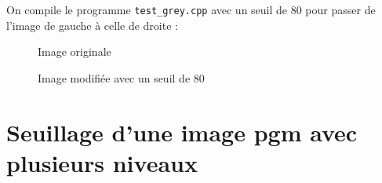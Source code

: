 \documentclass[french,a4paper,10pt]{article}
\begin{document}
	On compile le programme \texttt{test\_grey.cpp} avec un seuil de 80 pour passer de l'image de gauche à celle de
	droite :
	\begin{figure}[!htb]
		\begin{minipage}{0.48\textwidth}
			\centering
			\caption{Image originale}\label{Fig:orig-08}
		\end{minipage}\hfill
		\begin{minipage}{0.48\textwidth}
			\centering
			\caption{Image modifiée avec un seuil de 80}\label{Fig:test-grey-08}
		\end{minipage}
	\end{figure}
	\newpage
	\section{Seuillage d'une image pgm avec plusieurs niveaux}\label{sec:2}
\end{document}
